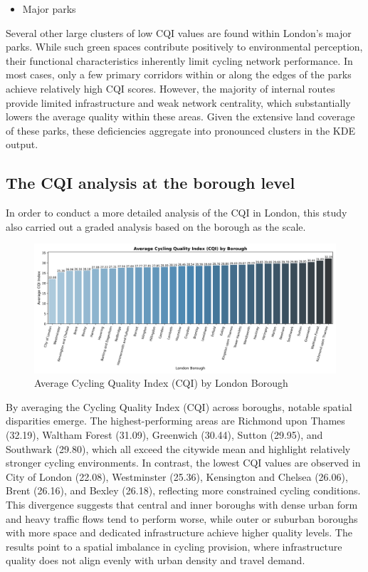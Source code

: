\documentclass[
  12pt,
  oneside]{book}
\providecommand{\tightlist}{%
  \setlength{\itemsep}{0pt}\setlength{\parskip}{0pt}}
\begin{document}
\begin{itemize}
\tightlist
\item
  Major parks
\end{itemize}

Several other large clusters of low CQI values are found within London's major parks. While such green spaces contribute positively to environmental perception, their functional characteristics inherently limit cycling network performance. In most cases, only a few primary corridors within or along the edges of the parks achieve relatively high CQI scores. However, the majority of internal routes provide limited infrastructure and weak network centrality, which substantially lowers the average quality within these areas. Given the extensive land coverage of these parks, these deficiencies aggregate into pronounced clusters in the KDE output.

\subsection{The CQI analysis at the borough level}\label{the-cqi-analysis-at-the-borough-level}

In order to conduct a more detailed analysis of the CQI in London, this study also carried out a graded analysis based on the borough as the scale.

\begin{figure}

{\centering \includegraphics[width=0.95\linewidth]{general_images/AverageCQIbyBorough} 

}

\caption{Average Cycling Quality Index (CQI) by London Borough}\label{fig:AverageCQIbyBorough}
\end{figure}

By averaging the Cycling Quality Index (CQI) across boroughs, notable spatial disparities emerge. The highest-performing areas are Richmond upon Thames (32.19), Waltham Forest (31.09), Greenwich (30.44), Sutton (29.95), and Southwark (29.80), which all exceed the citywide mean and highlight relatively stronger cycling environments. In contrast, the lowest CQI values are observed in City of London (22.08), Westminster (25.36), Kensington and Chelsea (26.06), Brent (26.16), and Bexley (26.18), reflecting more constrained cycling conditions. This divergence suggests that central and inner boroughs with dense urban form and heavy traffic flows tend to perform worse, while outer or suburban boroughs with more space and dedicated infrastructure achieve higher quality levels. The results point to a spatial imbalance in cycling provision, where infrastructure quality does not align evenly with urban density and travel demand.
\end{document}
